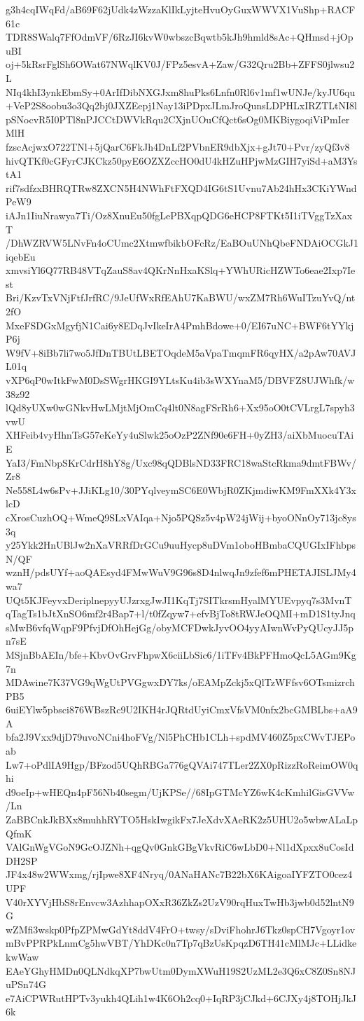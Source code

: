 g3h4cqIWqFd/aB69F62jUdk4zWzzaKlIkLyjteHvuOyGuxWWVX1VuShp+RACF61c
TDR8SWalq7FfOdmVF/6RzJI6kvW0wbszcBqwtb5kJh9hmld8sAc+QHmsd+jOpuBI
oj+5kRsrFglSh6OWat67NWqlKV0J/FPz5esvA+Zaw/G32Qru2Bb+ZFFS0jlwsu2L
NIq4khI3ynkEbmSy+0ArIfDibNXGJxm8huPks6Lnfn0Rl6v1mf1wUNJe/kyJU6qu
+VeP2S8oobu3o3Qq2bj0JXZEepj1Nay13iPDpxJLmJroQunsLDPHLxIRZTLtNI8l
pSNocvR5I0PTl8nPJCCtDWVkRqu2CXjnUOuCfQct6sOg0MKBiygoqiViPmIerMlH
fzscAcjwxO722TNl+5jQarC6FkJh4DnLf2PVbnER9dbXjx+gJt70+Pvr/zyQf3v8
hivQTKf0cGFyrCJKCkz50pyE6OZXZccHO0dU4kHZuHPjwMzGIH7yiSd+aM3YstA1
rif7sdfzxBHRQTRw8ZXCN5H4NWhFtFXQD4IG6tS1Uvnu7Ab24hHx3CKiYWndPeW9
iAJn1IiuNrawya7Ti/Oz8XnuEu50fgLePBXqpQDG6eHCP8FTKt5I1iTVggTzXaxT
/DhWZRVW5LNvFn4oCUmc2XtmwfbikbOFcRz/EaBOuUNhQbeFNDAiOCGkJ1iqebEu
xmvsiYl6Q77RB48VTqZauS8av4QKrNnHxaKSlq+YWhURicHZWTo6eae2Ixp7Iest
Bri/KzvTxVNjFtfJrfRC/9JeUfWxRfEAhU7KaBWU/wxZM7Rh6WuITzuYvQ/nt2fO
MxeFSDGxMgyfjN1Cai6y8EDqJvIkeIrA4PmhBdowe+0/EI67uNC+BWF6tYYkjP6j
W9fV+8iBb7li7wo5JfDnTBUtLBETOqdeM5aVpaTmqmFR6qyHX/a2pAw70AVJL01q
vXP6qP0wItkFwM0DsSWgrHKGI9YLtsKu4ib3sWXYnaM5/DBVFZ8UJWhfk/w38z92
lQd8yUXw0wGNkvHwLMjtMjOmCq4lt0N8agFSrRh6+Xx95oO0tCVLrgL7spyh3vwU
XHFeib4vyHhnTsG57eKeYy4uSlwk25oOzP2ZNf90e6FH+0yZH3/aiXbMuocuTAiE
YaI3/FmNbpSKrCdrH8hY8g/Uxc98qQDBlsND33FRC18waStcRkma9dmtFBWv/Zr8
Ne558L4w6sPv+JJiKLg10/30PYqlveymSC6E0WbjR0ZKjmdiwKM9FmXXk4Y3xlcD
cXrosCuzhOQ+WmeQ9SLxVAIqa+Njo5PQSz5v4pW24jWij+byoONnOy713jc8ys3q
y25Ykk2HnUBlJw2nXaVRRfDrGCu9uuHycp8uDVm1oboHBmbaCQUGIxIFhbpsN/QF
wznH/pdsUYf+aoQAEsyd4FMwWuV9G96s8D4nlwqJn9zfef6mPHETAJISLJMy4wa7
UQt5KJFeyvxDeriplnepyyUJzrxgJwJI1KqTj7SITkrsmHyalMYUEvpyq7s3MvnT
qTagTs1bJtXnSO6mf2r4Bap7+l/t0fZqyw7+efvBjTo8tRWJeOQMI+mD1S1tyJnq
sMwB6vfqWqpF9PfvjDfOhHejGg/obyMCFDwkJyvOO4yyAIwnWvPyQUcyJJ5pn7sE
MSjnBbAEIn/bfe+KbvOvGrvFhpwX6ciiLbSic6/1iTFv4BkPFHmoQcL5AGm9Kg7n
MDAwine7K37VG9qWgUtPVGgwxDY7ks/oEAMpZckj5xQlTzWFfsv6OTsmizrchPB5
6uiEYlw5pbsci876WBszRc9U2IKH4rJQRtdUyiCmxVfsVM0nfx2bcGMBLbs+aA9A
bfa2J9Vxx9djD79uvoNCni4hoFVg/Nl5PhCHb1CLh+spdMV460Z5pxCWvTJEPoab
Lw7+oPdlIA9Hgp/BFzod5UQhRBGa776gQVAi747TLer2ZX0pRizzRoReimOW0qhi
d9oeIp+wHEQn4pF56Nb40segm/UjKPSe//68IpGTMcYZ6wK4cKmhilGisGVVw/Ln
ZaBBCnkJkBXx8muhhRYTO5HskIwgikFx7JeXdvXAeRK2z5UHU2o5wbwALaLpQfmK
VAlGnWgVGoN9GcOJZNh+qgQv0GnkGBgVkvRiC6wLbD0+Nl1dXpxx8uCosIdDH2SP
JF4x48w2WWxmg/rjIpwe8XF4Nryq/0ANaHANc7B22bX6KAigoaIYFZTO0cez4UPF
V40rXYVjHbS8rEnvcw3AzhhapOXxR36ZkZs2UzV90rqHuxTwHb3jwb0d52lntN9G
wZMfi3wskp0PfpZPMwGdYt8ddV4FrO+twsy/sDviFhohrJ6Tkz0spCH7Vgoyr1ov
mBvPPRPkLnmCg5hwVBT/YhDKc0n7Tp7qBzUsKpqzD6TH41cMlMJc+LLidkekwWaw
EAeYGhyHMDn0QLNdkqXP7bwUtm0DymXWuH19S2UzML2e3Q6xC8Z0Sn8NJuPSn74G
e7AiCPWRutHPTv3yukh4QLih1w4K6Oh2cq0+IqRP3jCJkd+6CJXy4j8TOHjJkJ6k
